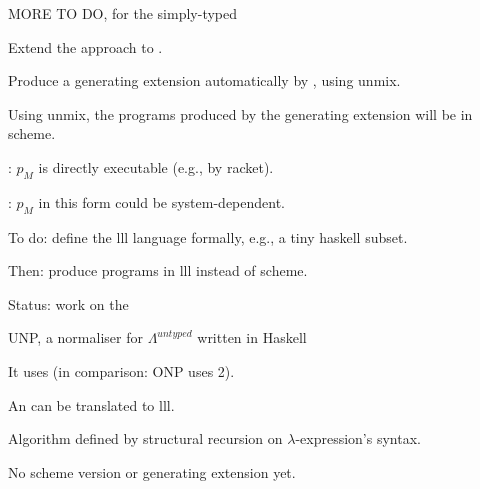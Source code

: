 \documentclass[12pt,fleqn,landscape]{article}
\begin{document}

\begin{slide}{MORE TO DO,  for the simply-typed \lc }

\be

\item Extend the approach to .
\vair

\item Produce a generating extension automatically by ,  using {\sc unmix}. 
\vair

\item Using {\sc unmix}, the programs produced by the generating extension will be  in {\sc scheme}. 

\bi
\item 
{}: $p_M$ is directly executable (e.g., by {\sc racket}).
\vair

\item {}: $p_M$ in this form could be system-dependent. 
\ei
\vair

\item To do: define the {\sc lll} language formally, e.g., a tiny {\sc haskell} subset.
\vair\vair

\item Then: produce programs in  {\sc lll}  instead of {\sc scheme}.

\ee

\end{slide}


\begin{slide}{Status:  work on the  \lc }

\be

\item UNP, a normaliser for $\Lambda^{untyped}$ written in {\sc Haskell}
\vair

\item It uses   (in comparison: ONP uses 2).
\vair

\item An  can be translated to {\sc lll}.
\vair

\item Algorithm   defined by structural recursion on   $\lambda$-expression's syntax.
\vair

\item No {\sc scheme} version or generating extension yet.
\ee

\end{slide}
\end{document}
